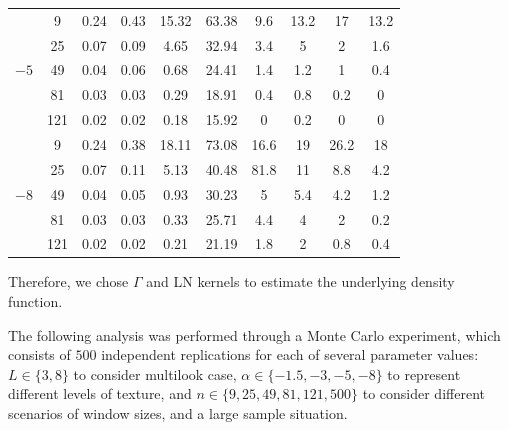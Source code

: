 \documentclass[twocolumn]{svjour3}
\begin{document}
\begin{table}[hbt]
\begin{tabular}{cc S[table-format=0.1]S[table-format=0.1]S[table-format=0.1] S[table-format=0.1] @{\hskip 8mm} S[table-format=0.2]S[table-format=0.1]S[table-format=0.1]S[table-format=0.1]}
			\midrule                                        
			&  9       &       0.24     &     0.43     &     15.32     &     63.38     &    9.6    &    13.2    &   17         &    13.2 \\                    
			&  25      &       0.07     &     0.09     &     4.65      &     32.94     &    3.4    &   5        &    2         &    1.6 \\                    
			&  49      &       0.04     &     0.06     &     0.68      &     24.41     &    1.4    &    1.2     &    1         &    0.4 \\
			&  81      &       0.03     &     0.03     &     0.29      &     18.91     &    0.4    &    0.8     &    0.2       &    0 \\
			&  121     &       0.02     &     0.02     &     0.18      &     15.92     &    0      &    0.2     &    0         &    0 \\
			
			\midrule                                        
			&  9       &       0.24     &     0.38     &     18.11     &     73.08     &    16.6    &    19     & 26.2         &    18 \\                
			&  25      &       0.07     &     0.11     &     5.13      &     40.48     &    81.8    &   11      &    8.8       &    4.2 \\            
			&  49      &       0.04     &     0.05     &     0.93      &     30.23     &    5       &    5.4    &    4.2       &    1.2 \\    
			&  81      &       0.03     &     0.03     &     0.33      &     25.71     &    4.4     &    4      &    2         &    0.2 \\    
			&  121     &       0.02     &     0.02     &     0.21      &     21.19     &    1.8     &    2      &    0.8       &    0.4 \\
			\bottomrule
		\end{tabular}                                              
	\end{table}    
	
	Therefore, we chose $\Gamma$ and LN kernels to estimate the underlying density function.
	
	The following analysis was performed through a Monte Carlo experiment, which consists of $500$ independent replications for each of several parameter values: 
	$L\in\{3,8\}$ to consider multilook case,
	$\alpha\in\{-1.5, -3, -5, -8\}$ to represent different levels of texture, 
	and 
	$n\in\{9, 25,49, 81,121,500\}$ to consider different scenarios of window sizes, and a large sample situation.
	
\end{document}

